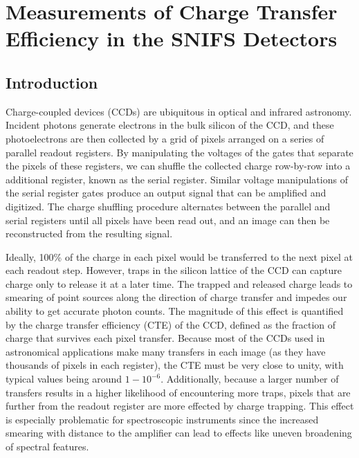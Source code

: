 \chapter{Measurements of Charge Transfer Efficiency in the SNIFS Detectors}
\label{chap:cte}

\section{Introduction}
Charge-coupled devices (CCDs) are ubiquitous in optical and infrared astronomy. Incident photons generate electrons in the bulk silicon of the CCD, and these photoelectrons are then collected by a grid of pixels arranged on a series of parallel readout registers. By manipulating the voltages of the gates that separate the pixels of these registers, we can shuffle the collected charge row-by-row into a additional register, known as the serial register. Similar voltage manipulations of the serial register gates produce an output signal that can be amplified and digitized. The charge shuffling procedure alternates between the parallel and serial registers until all pixels have been read out, and an image can then be reconstructed from the resulting signal.

Ideally, 100\% of the charge in each pixel would be transferred to the next pixel at each readout step. However, traps in the silicon lattice of the CCD can capture charge only to release it at a later time. The trapped and released charge leads to smearing of point sources along the direction of charge transfer and impedes our ability to get accurate photon counts. The magnitude of this effect is quantified by the charge transfer efficiency (CTE) of the CCD, defined as the fraction of charge that survives each pixel transfer. Because most of the CCDs used in astronomical applications make many transfers in each image (as they have thousands of pixels in each register), the CTE must be very close to unity, with typical values being around $1-10^{-6}$. Additionally, because a larger number of transfers results in a higher likelihood of encountering more traps, pixels that are further from the readout register are more effected by charge trapping. This effect is especially problematic for spectroscopic instruments since the increased smearing with distance to the amplifier can lead to effects like uneven broadening of spectral features.

